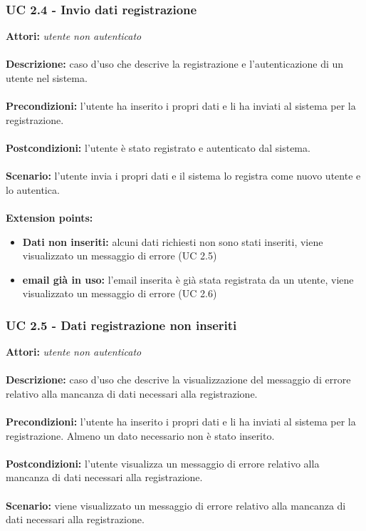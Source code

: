 \documentclass[a4paper,11pt]{article}
\begin{document}
\subsubsection{UC 2.4 - Invio dati registrazione}

\textbf{Attori:} \textit{utente non autenticato}
\\ \\
\textbf{Descrizione:} caso d'uso che descrive la registrazione e l'autenticazione di un utente nel sistema.\\
\\
\textbf{Precondizioni:} l'utente ha inserito i propri dati e li ha inviati al sistema per la registrazione.\\
\\
\textbf{Postcondizioni:} l’utente è stato registrato e autenticato dal sistema.\\
\\
\textbf{Scenario:} l’utente invia i propri dati e il sistema lo registra come nuovo utente e lo autentica.\\
\\
\textbf{Extension points:} 
\begin{itemize}
	\item \textbf{Dati non inseriti:} alcuni dati richiesti non sono stati inseriti, viene visualizzato un messaggio di errore (UC 2.5)
	\item \textbf{email già in uso:} l'email inserita è già stata registrata da un utente, viene visualizzato un messaggio di errore (UC 2.6)
\end{itemize}


\subsubsection{UC 2.5 - Dati registrazione non inseriti}

\textbf{Attori:} \textit{utente non autenticato}
\\ \\
\textbf{Descrizione:} caso d'uso che descrive la visualizzazione del messaggio di errore relativo alla mancanza di dati necessari alla registrazione.\\
\\
\textbf{Precondizioni:} l'utente ha inserito i propri dati e li ha inviati al sistema per la registrazione. Almeno un dato necessario non è stato inserito.\\
\\
\textbf{Postcondizioni:} l’utente visualizza un messaggio di errore relativo alla mancanza di dati necessari alla registrazione.\\
\\
\textbf{Scenario:} viene visualizzato un messaggio di errore relativo alla mancanza di dati necessari alla registrazione.\\
\end{document}
